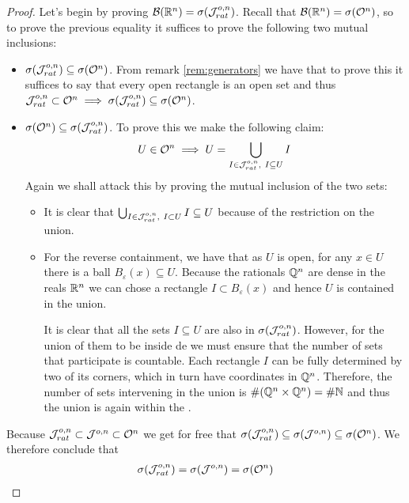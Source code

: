 \begin{proof}
	Let's begin by proving $\mathcal{B}(\mathbb{R}^n) = \sigma(\mathcal{J}^{o,n}_{rat})$. Recall that $\mathcal{B}(\mathbb{R}^n) = \sigma(\mathcal{O}^n)$, so to prove the previous equality it suffices to prove the following two mutual inclusions:
	\begin{itemize}
		\item $\sigma(\mathcal{J}^{o,n}_{rat}) \subseteq \sigma(\mathcal{O}^n)$. From remark \ref{rem:generators} we have that to prove this it suffices to say that every open rectangle is an open set and thus $\mathcal{J}_{rat}^{o,n} \subset \mathcal{O}^n \implies \sigma(\mathcal{J}^{o,n}_{rat}) \subseteq \sigma(\mathcal{O}^n)$.
		\item $\sigma(\mathcal{O}^n) \subseteq \sigma(\mathcal{J}^{o,n}_{rat})$. To prove this we make the following claim:
		\begin{align*}
		U \in \mathcal{O}^n \implies U = \bigcup_{I \in \mathcal{J}_{rat}^{o,n},\ I \subseteq U} I
		\end{align*}
		Again we shall attack this by proving the mutual inclusion of the two sets:
		\begin{itemize}
			\item It is clear that $\bigcup_{I \in \mathcal{J}_{rat}^{o,n},\ I \subset U} I \subseteq U$ because of the restriction on the union.
			\item For the reverse containment, we have that as $U$ is open, for any $x \in U$ there is a ball $B_\varepsilon(x) \subseteq U$. Because the rationals $\mathbb{Q}^n$ are dense in the reals $\mathbb{R}^n$ we can chose a rectangle $I \subset B_\varepsilon(x)$ and hence $U$ is contained in the union.
			
			It is clear that all the sets $I \subseteq U$ are also in $\sigma(\mathcal{J}_{rat}^{o,n})$. However, for the union of them to be inside de \siga we must ensure that the number of sets that participate is countable. Each rectangle $I$ can be fully determined by two of its corners, which in turn have coordinates in $\mathbb{Q}^n$. Therefore, the number of sets intervening in the union is $\# (\mathbb{Q}^n \times \mathbb{Q}^n) = \# \mathbb{N}$ and thus the union is again within the \siga.
		\end{itemize}
	\end{itemize}
	
	Because $\mathcal{J}_{rat}^{o,n} \subset \mathcal{J}^{o,n} \subset \mathcal{O}^n$ we get for free that $\sigma(\mathcal{J}_{rat}^{o,n}) \subseteq \sigma(\mathcal{J}^{o,n}) \subseteq \sigma(\mathcal{O}^n)$. We therefore conclude that
	\begin{align*}
	\sigma(\mathcal{J}_{rat}^{o,n}) = \sigma(\mathcal{J}^{o,n}) = \sigma(\mathcal{O}^n)
	\end{align*}
	

\end{proof}
